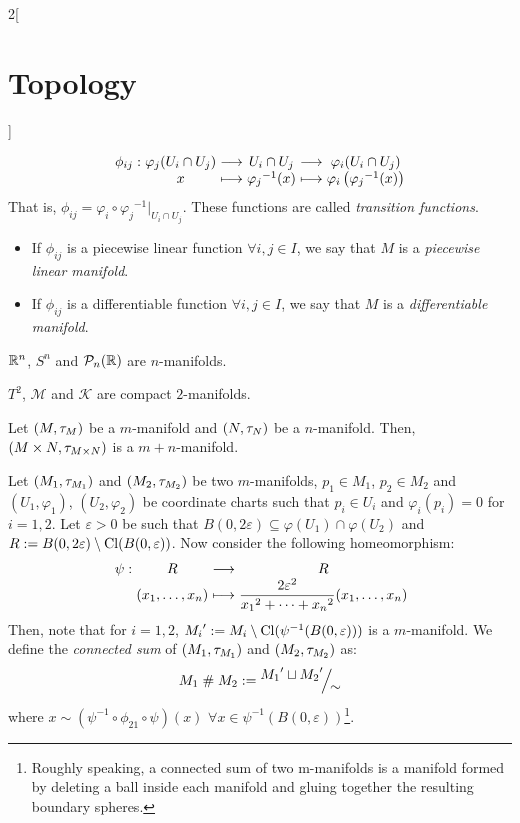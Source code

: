 \documentclass[../../../main.tex]{subfiles}
\begin{document}
\begin{multicols}{2}[\section{Topology}]
\begin{definition}
$$      \begin{array}{r@{\hspace{0.5\tabcolsep}}c@{\hspace{0.5\tabcolsep}}c@{\hspace{0.5\tabcolsep}}c@{\hspace{0.5\tabcolsep}}c@{\hspace{0.5\tabcolsep}}c}
        \phi_{ij}: & \varphi_j(U_i\cap U_j) & \longrightarrow & U_i\cap U_j         & \longrightarrow & \varphi_i(U_i\cap U_j)                    \\
                   & x                      & \longmapsto     & {\varphi_j}^{-1}(x) & \longmapsto     & \varphi_i\left({\varphi_j}^{-1}(x)\right)
      \end{array}$$
    That is, $\phi_{ij}=\varphi_i\circ{\varphi_j}^{-1}|_{U_i\cap U_j}$. These functions are called \emph{transition functions}.
    \begin{itemize}
      \item If $\phi_{ij}$ is a piecewise linear function $\forall i,j\in I$, we say that $M$ is a \emph{piecewise linear manifold}.
      \item If $\phi_{ij}$ is a differentiable function $\forall i,j\in I$, we say that $M$ is a \emph{differentiable manifold}.
    \end{itemize}
  \end{definition}
  \begin{proposition}
    $\mathbb{R}^n$, $S^n$ and $\mathcal{P}_n(\mathbb{R})$ are $n$-manifolds.
  \end{proposition}
  \begin{proposition}
    $T^2$, $\mathcal{M}$ and $\mathcal{K}$ are compact $2$-manifolds.
  \end{proposition}
  \begin{proposition}
    Let $(M,\tau_M)$ be a $m$-manifold and $(N,\tau_N)$ be a $n$-manifold. Then, $(M\times N,\tau_{M\times N})$ is a $m+n$-manifold.
  \end{proposition}
  \begin{definition}
    Let $(M_1,\tau_{M_1})$ and $(M_2,\tau_{M_2})$ be two $m$-manifolds, $p_1\in M_1$, $p_2\in M_2$ and $(U_1,\varphi_1)$, $(U_2,\varphi_2)$ be coordinate charts such that $p_i\in U_i$ and $\varphi_i(p_i)=0$ for $i=1,2$. Let $\varepsilon>0$ be such that $B(0,2\varepsilon)\subseteq \varphi(U_1)\cap \varphi(U_2)$ and $R:=B(0,2\varepsilon)\setminus\operatorname{Cl} (B(0,\varepsilon))$. Now consider the following homeomorphism:
    $$\function{\psi}{R}{R}{(x_1,\ldots,x_n)}{\displaystyle\frac{2\varepsilon^2}{{x_1}^2+\cdots+{x_n}^2}(x_1,\ldots,x_n)}$$
    Then, note that for $i=1,2$, ${M_i}':=M_i\setminus\operatorname{Cl}(\psi^{-1}(B(0,\varepsilon)))$ is a $m$-manifold. We define the \emph{connected sum} of $(M_1,\tau_{M_1})$ and $(M_2,\tau_{M_2})$ as: $$M_1\conn M_2:=\quot{{M_1}'\sqcup{M_2}'}{\sim}$$
    where $x\sim (\psi^{-1}\circ\phi_{21}\circ\psi)(x)$ $\forall x\in \psi^{-1}(B(0,\varepsilon))$\footnote{Roughly speaking, a connected sum of two m-manifolds is a manifold formed by deleting a ball inside each manifold and gluing together the resulting boundary spheres.}.
  \end{definition}

\end{multicols}
\end{document}
